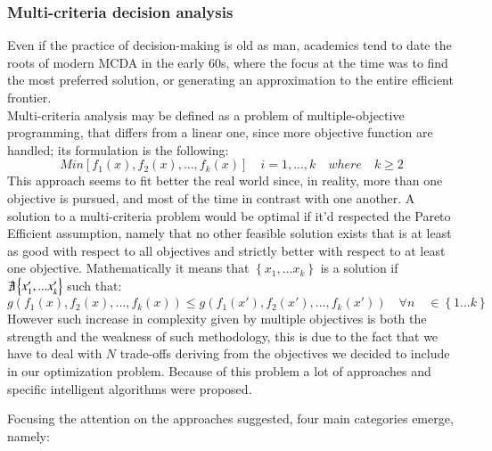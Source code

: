 \begin{doublespace}
\subsubsection{Multi-criteria decision analysis}
Even if the practice of decision-making is old as man, academics tend to date the roots of modern MCDA in the early 60s, where the focus at the time was to find the most preferred solution, or generating an approximation to the entire efficient frontier\cite{Greco2016}.
\\
Multi-criteria analysis may be defined as a problem of multiple-objective programming, that differs from a linear one,
since more objective function are handled; its formulation is the following:
	$$
	Min[f_1(x),f_2(x),...,f_k(x)] \quad i=1,...,k \quad where \quad k\geq2
	$$
This approach seems to fit better the real world since, in reality, more than one objective is pursued, and most of the time in contrast with one another.
A solution to a multi-criteria problem would be optimal if it'd respected the Pareto Efficient assumption, namely that no other feasible solution exists that is at least as good with respect to all objectives and strictly better with respect to at least one objective. Mathematically it means that $\left\{x_1,...x_k\right\}$ is a solution if $\not\exists \left\{x'_1,...x'_k\right\}$
such that:
	\[
	g(f_1(x),f_2(x),...,f_k(x)) \leq g(f_1(x'),f_2(x'),...,f_k(x')) \quad \forall n \quad \in  \left\{1...k\right\}
	\]
However such increase in complexity given by multiple objectives is both the strength and the weakness of such methodology, this is due to the fact that we have to deal with $N$ trade-offs deriving from the objectives we decided to include in our optimization problem. Because of this problem a lot of approaches and specific intelligent algorithms were proposed\cite{Cui2017}.

Focusing the attention on the approaches suggested, four main categories emerge, namely:


\end{doublespace}
